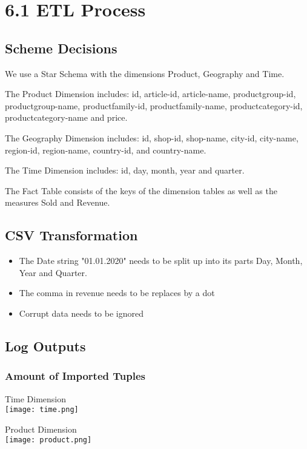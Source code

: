 \documentclass[ngerman]{dis-template-add}
\begin{document}
\section*{6.1 ETL Process}

\subsection*{Scheme Decisions}

We use a Star Schema with the dimensions Product, Geography and Time.

The Product Dimension includes:
id, article-id, article-name, productgroup-id, productgroup-name, productfamily-id, productfamily-name, productcategory-id, productcategory-name and price.

The Geography Dimension includes:
id, shop-id, shop-name, city-id, city-name, region-id, region-name, country-id, and country-name.

The Time Dimension includes:
id, day, month, year and quarter.
	
The Fact Table consists of the keys of the dimension tables as well as the measures Sold and Revenue.


\subsection*{CSV Transformation}

\begin{itemize}
\item The Date string "01.01.2020" needs to be split up into its parts Day, Month, Year and Quarter.
\item The comma in revenue needs to be replaces by a dot
\item Corrupt data needs to be ignored
\end{itemize}


\subsection*{Log Outputs}

\subsubsection*{Amount of Imported Tuples}

Time Dimension \\
\texttt{[image: time.png]}

Product Dimension \\
\texttt{[image: product.png]}
\end{document}
